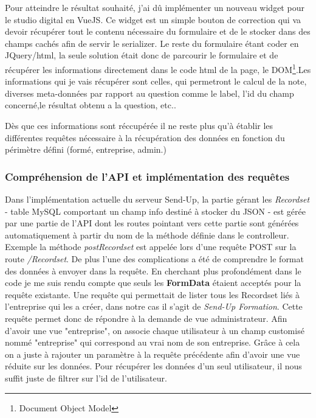 Pour atteindre le résultat souhaité, j'ai dû implémenter un nouveau widget pour le studio digital en VueJS. Ce widget est un simple bouton de correction qui va devoir récupérer tout le contenu nécessaire du formulaire et de le stocker dans des champs cachés afin de servir le serializer. Le reste du formulaire étant coder en JQuery/html, la seule solution était donc de parcourir le formulaire et de récupérer les informations directement dans le code html de la page, le DOM\footnote{Document Object Model}.Les informations qui je vais récupérer sont celles, qui permetront le calcul de la note, diverses meta-données par rapport au question comme le label, l'id du champ concerné,le résultat obtenu a la question, etc.. 

Dès que ces informations sont réccupérée il ne reste plus qu'à établir les différentes requêtes nécessaire à la récupération des données en fonction du périmètre défini (formé, entreprise, admin.)


\subsubsection{Compréhension de l'API et implémentation des requêtes}

Dans l'implémentation actuelle du serveur Send-Up, la partie gérant les \textit{Recordset} - table MySQL comportant un champ info destiné à stocker du JSON - est gérée par une partie de l'API dont les routes pointant vers cette partie sont générées automatiquement à partir du nom de la méthode définie dans le controlleur. Exemple la méthode \textit{postRecordset} est appelée lors d'une requête POST sur la route \textit{/Recordset}. De plus l'une des complications a été de comprendre le format des données à envoyer dans la requête. En cherchant plus profondément dans le code je me suis rendu compte que seuls les \textbf{FormData} étaient acceptés pour la requête existante.
Une requête qui permettait de lister tous les Recordset liés à l'entreprise qui les a créer, dans notre cas il s'agit de \textit{Send-Up Formation}. Cette requête permet donc de répondre à la demande de vue administrateur. Afin d'avoir une vue "entreprise", on associe chaque utilisateur à  un champ customisé nommé "entreprise" qui correspond au vrai nom de son entreprise. Grâce à cela on a juste à rajouter un paramètre à la requête précédente afin d'avoir une vue réduite sur les données. 
Pour récupérer les données d'un seul utilisateur, il nous suffit juste de filtrer sur l'id de l'utilisateur.   

